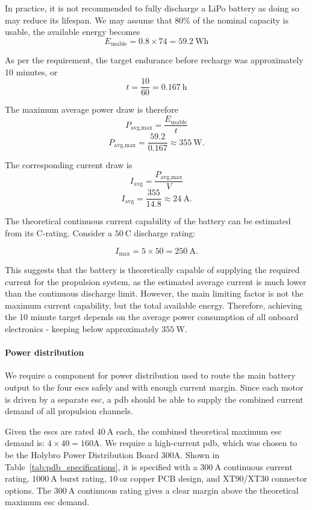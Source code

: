 \documentclass{report_template_oxford}
\begin{document}
In practice, it is not recommended to fully discharge a LiPo battery as doing so may reduce its lifespan. We may assume that 80\% of the nominal capacity is usable, the available energy becomes
\[
E_{\text{usable}} = 0.8 \times 74 = 59.2~\text{Wh}
\]

As per the requirement, the target endurance before recharge was approximately 10 minutes, or 
\[
t = \frac{10}{60} = 0.167~\text{h}
\]

The maximum average power draw is therefore
\begin{equation}
P_{\text{avg,max}} = \frac{E_{\text{usable}}}{t}
\end{equation}
\[
P_{\text{avg,max}} = \frac{59.2}{0.167} \approx 355~\text{W}.
\]

The corresponding current draw is
\begin{equation}
I_{\text{avg}} = \frac{P_{\text{avg,max}}}{V}
\end{equation}
\[
I_{\text{avg}} = \frac{355}{14.8} \approx 24~\text{A}.
\]

The theoretical continuous current capability of the battery can be estimated from its C-rating. Consider a \(50~\text{C}\) discharge rating:

\[
I_{\text{max}} = 5 \times 50 = 250~\text{A}.
\]

This suggests that the battery is theoretically capable of supplying the required current for the propulsion system, as the estimated average current is much lower than the continuous discharge limit. However, the main limiting factor is not the maximum current capability, but the total available energy. Therefore, achieving the 10 minute target depends on the average power consumption of all onboard electronics - keeping below approximately \(355~\text{W}\).

\paragraph{Power distribution}

We require a component for power distribution used to route the main battery output to the four \gls{esc}s safely and with enough current margin. Since each motor is driven by a separate \gls{esc}, a \gls{pdb} should be able to supply the combined current demand of all propulsion channels.

Given the \gls{esc}s are rated \(40~\text{A}\) each, the combined theoretical maximum \gls{esc} demand is: $4\times40=160\text{A}$. We require a high-current \gls{pdb}, which was chosen to be the Holybro Power Distribution Board 300A. Shown in Table~\ref{tab:pdb_specifications}, it is specified with a \(300~\text{A}\) continuous current rating, \(1000~\text{A}\) burst rating, \(10~\text{oz}\) copper PCB design, and XT90/XT30 connector options. The \(300~\text{A}\) continuous rating gives a clear margin above the theoretical maximum \gls{esc} demand.
\end{document}
